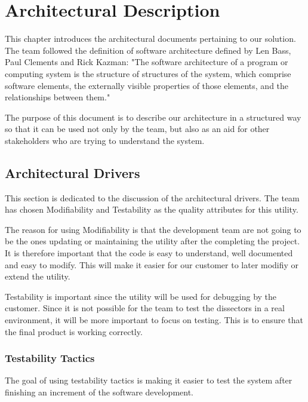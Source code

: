 \chapter{Architectural Description}
This chapter introduces the architectural documents pertaining to our solution. The team followed the definition of software architecture defined by Len Bass, Paul Clements and Rick Kazman: "The software architecture of a program or computing
system is the structure of structures of the system, which comprise software elements, the externally visible properties of those elements, and the relationships between them."\cite{Bass2003}

The purpose of this document is to describe our architecture in a structured way so that it can be used not only by the team, but also as an aid for other stakeholders who are trying to understand the system.


\section{Architectural Drivers}
This section is dedicated to the discussion of the architectural drivers.
The team has chosen Modifiability and Testability as the quality attributes for this \gls{utility}. 

The reason for using Modifiability is that the development team are not going to be the ones updating or maintaining the \gls{utility} after the completing the project. It is therefore important that the code is easy to understand, well documented and easy to modify. This will make it easier for our customer to later modifiy or extend the \gls{utility}.

Testability is important since the \gls{utility} will be used for debugging by the customer.  Since it is not possible for the team to test the \glspl{dissector} in a real environment, it will be more important to focus on testing. This is to ensure that the final product is working correctly.

\subsection{Testability Tactics}
The goal of using testability tactics is making it easier to test the system after finishing an increment of the software development. 

